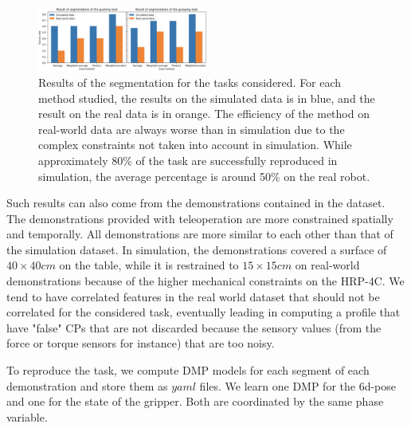 \documentclass[conference]{IEEEtran}
\begin{document}
\begin{figure}[t]
  \centering
  \includegraphics[width=0.5\textwidth]{img/results_segmentation.png}
  \caption{Results of the segmentation for the tasks considered. For each method studied, the results on the simulated data is in blue, and the result on the real data is in orange. The efficiency of the method on real-world data are always worse than in simulation due to the complex constraints not taken into account in simulation. While approximately 80\% of the task are successfully reproduced in simulation, the average percentage is around 50\% on the real robot.}
  \label{fig:resultsSeg}
\end{figure}

Such results can also come from the demonstrations contained in the dataset. The demonstrations provided with teleoperation are more constrained spatially and temporally. All demonstrations are more similar to each other than that of the simulation dataset. In simulation, the demonstrations covered a surface of $40 \times 40 cm$ on the table, while it is restrained to $15 \times 15 cm$ on real-world demonstrations because of the higher mechanical constraints on the HRP-4C.  We tend to have correlated features in the real world dataset that should not be correlated for the considered task, eventually leading in computing a profile that have "false" CPs that are not discarded because the sensory values (from the force or torque sensors for instance) that are too noisy. \newline

To reproduce the task, we compute DMP models for each segment of each demonstration and store them as $yaml$ files. We learn one DMP for the 6d-pose and one for the state of the gripper. Both are coordinated by the same phase variable.
\end{document}
